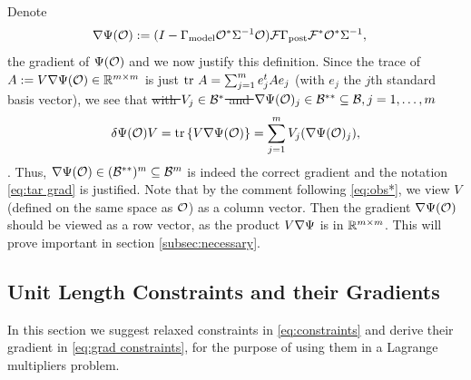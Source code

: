 \documentclass{amsart}
\numberwithin{equation}{section}
\providecommand{\DIFadd}[1]{{\protect\color{blue}\uwave{#1}}} %
\providecommand{\DIFdel}[1]{{\protect\color{red}\sout{#1}}}                      %
\providecommand{\DIFaddbegin}{} %
\providecommand{\DIFaddend}{} %
\providecommand{\DIFdelbegin}{} %
\providecommand{\DIFdelend}{} %
\begin{document}
\DIFaddend Denote
\begin{align}\label{eq:tar grad}
  \nabla \Psi(\mathcal{O}) &:= (I - \Gamma_{\textup{model}} \mathcal{O}^* \Sigma^{-1} \mathcal{O}) \mathcal{F}
  \Gamma_{\textup{post}} \mathcal{F}^* \mathcal{O}^*\Sigma^{-1},
\end{align}
the gradient of $\Psi (\mathcal{O} )$ and we now justify this definition.
Since the trace of $A := V \nabla \Psi(\mathcal{O}) \in \mathbb{R}^{m \times m}$ is
just $\textup{tr}\ A = \sum_{j=1}^m e_j^t A e_j$ (with $e_j$ the $j$th standard
basis vector), we see that
\DIFdelbegin %
\DIFdel{with $V_j \in \mathcal{B}^*$ and $\nabla \Psi(\mathcal{O})_j \in \mathcal{B}^{**}\subseteq
\mathcal{B}, j=1,\dots,m$}\DIFdelend \DIFaddbegin \begin{align*}
  \delta \Psi(\mathcal{O})V = \textup{tr}\left \{V \nabla \Psi(\mathcal{O}) \right \} = \sum_{j=1}^m
  V_j(\nabla \Psi(\mathcal{O})_j),
\end{align*}
\DIFadd{with $V_j \in \hilo^*$ and $\nabla \tar(\obs)_j \in \hilo^{**} =
\hilo, j=1,\dots,m$}\DIFaddend . Thus, \DIFdelbegin \DIFdel{$\nabla \Psi( \mathcal{O} ) \in (\mathcal{B}^{**})^m
\subseteq \mathcal{B}^m$ }\DIFdelend \DIFaddbegin \DIFadd{$\nabla \tar( \obs ) \in \hilo^m$ }\DIFaddend is indeed
the correct gradient and the notation \eqref{eq:tar grad} is
justified. Note that by the comment following \eqref{eq:obs*}, we view
$V$ (defined on the same space as $\mathcal{O}$) as a column vector. Then the
gradient $\nabla \Psi(\mathcal{O})$ should be viewed as a row vector, as the
product $V \nabla \Psi$ is in $\mathbb{R}^{m \times m}$. This will prove
important in section \ref{subsec:necessary}.

\subsection{Unit Length Constraints and their Gradients}\label{subsec:unit length}
In this section we suggest relaxed constraints in
\eqref{eq:constraints} and derive their gradient in \eqref{eq:grad
  constraints}, for the purpose of using them in a Lagrange
multipliers problem.
\end{document}
